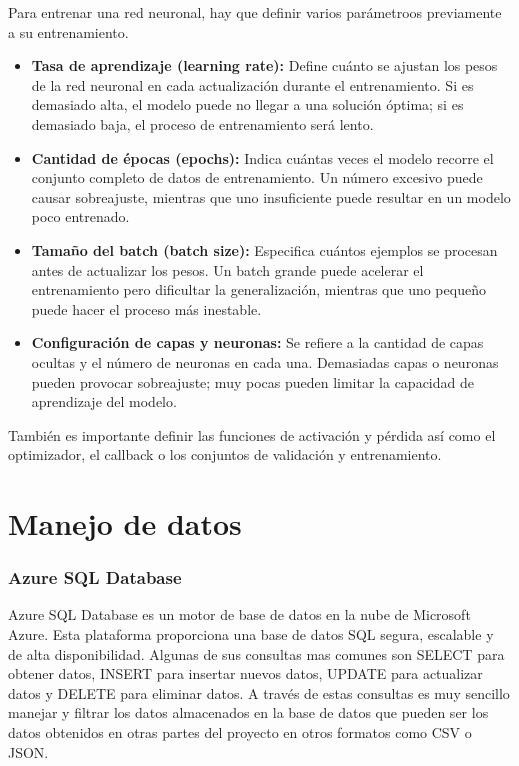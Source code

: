 Para entrenar una red neuronal, hay que definir varios parámetroos previamente a su entrenamiento.
\begin{itemize}
	\item \textbf{Tasa de aprendizaje (learning rate):} Define cuánto se ajustan los pesos de la red neuronal en cada actualización durante el entrenamiento. Si es demasiado alta, el modelo puede no llegar a una solución óptima; si es demasiado baja, el proceso de entrenamiento será lento.
	\item \textbf{Cantidad de épocas (epochs):} Indica cuántas veces el modelo recorre el conjunto completo de datos de entrenamiento. Un número excesivo puede causar sobreajuste, mientras que uno insuficiente puede resultar en un modelo poco entrenado.
	\item \textbf{Tamaño del batch (batch size):} Especifica cuántos ejemplos se procesan antes de actualizar los pesos. Un batch grande puede acelerar el entrenamiento pero dificultar la generalización, mientras que uno pequeño puede hacer el proceso más inestable.
	\item \textbf{Configuración de capas y neuronas:} Se refiere a la cantidad de capas ocultas y el número de neuronas en cada una. Demasiadas capas o neuronas pueden provocar sobreajuste; muy pocas pueden limitar la capacidad de aprendizaje del modelo.
\end{itemize}

También es importante definir las funciones de activación y pérdida así como el optimizador, el callback o los conjuntos de validación y entrenamiento.

\section{Manejo de datos}

\subsubsection{Azure SQL Database}

Azure SQL Database es un motor de base de datos en la nube de Microsoft Azure.
Esta plataforma proporciona una base de datos SQL segura, escalable y de alta disponibilidad.\cite{azure}
Algunas de sus consultas mas comunes son SELECT para obtener datos, INSERT para insertar nuevos datos, UPDATE para actualizar datos y DELETE para eliminar datos.
A través de estas consultas es muy sencillo manejar y filtrar los datos almacenados en la base de datos que pueden ser los datos obtenidos en otras partes del proyecto en otros formatos como CSV o JSON.

